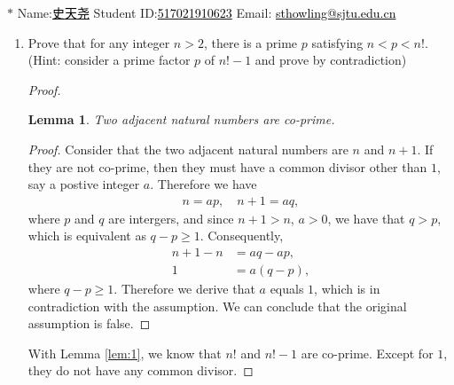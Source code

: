 \documentclass[12pt,a4paper,UTF8]{article}
\newtheorem{lemma}[theorem]{Lemma}
\theoremstyle{definition}
\begin{document}
\noindent

\noindent{}
\begin{center}
\vspace{10pt}
\footnotesize{\color{blue}$*$ Name:\uline{\textcolor{black}{史}\textcolor{black}{天}\textcolor{black}{尧}}  \quad Student ID:\uline{\textcolor{black}{517021910623}} \quad Email: \uline{\textcolor{black}{sthowling@sjtu.edu.cn}}}
\end{center}

\begin{enumerate}
    \item
    Prove that for any integer $n>2$, there is a prime $p$ satisfying $n<p<n!$. {\color{blue}(Hint: consider a prime factor $p$ of $n!-1$ and prove by contradiction)}
    \begin{proof}	
    	\begin{minipage}[t]{0.8\textwidth}
    		\begin{lemma} \label{lem:1}
    			Two adjacent natural numbers are co-prime.
    		\end{lemma}
    		\begin{proof}
    			Consider that the two adjacent natural numbers are $n$ and $n+1$. If they are not co-prime, then they must have a common divisor other than $1$, say a postive integer $a$. Therefore we have 
    			\begin{align*}
    				n=ap, \quad n+1=aq,
    			\end{align*}
    			where $p$ and $q$ are intergers, and since $n+1>n$, $a>0$, we have that $q>p$, which is equivalent as $q-p\geq 1$. Consequently,
    			\begin{align*}
    				n+1-n&=aq-ap,\\
    				1&=a(q-p),
    			\end{align*}
    			where $q-p\geq 1$. Therefore we derive that $a$ equals $1$, which is in contradiction with the assumption. We can conclude that the original assumption is false.
    		\end{proof}   
    	\end{minipage}
        
        
        With Lemma \eqref{lem:1}, we know that $n!$ and $n!-1$ are co-prime. Except for $1$, they do not have any common divisor. 
        

\end{proof}
\end{enumerate}
\end{document}
